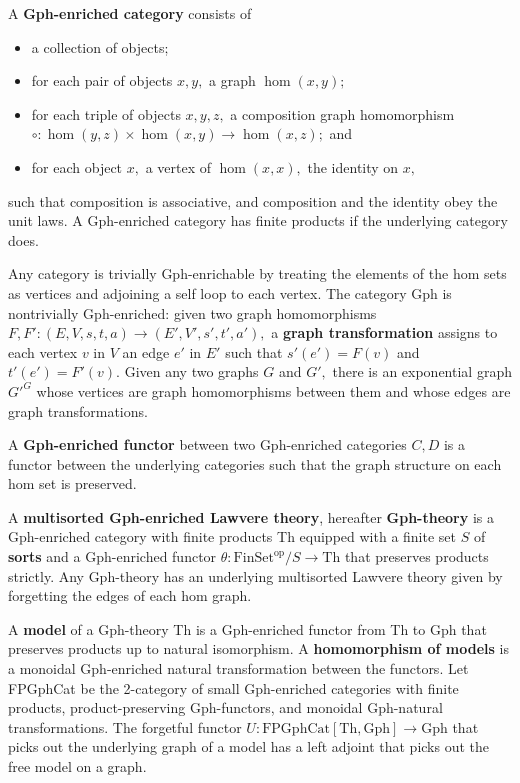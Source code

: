 \documentclass[a4paper,UKenglish]{article}
\newcommand{\maps}{\colon}
\newcommand{\Th}{\mathrm{Th}}
\newcommand{\Gph}{\mathrm{Gph}}
\newcommand{\FinSet}{\mathrm{FinSet}}
\newcommand{\FPGphCat}{\mathrm{FPGphCat}}
\newcommand{\op}{\mathrm{op}}
\begin{document}
A {\bf Gph-enriched category} consists of
\begin{itemize}
  \item a collection of objects;
  \item for each pair of objects $x, y,$ a graph $\hom(x,y);$
  \item for each triple of objects $x, y, z,$ a composition graph homomorphism $\circ\maps \hom(y, z) \times \hom(x, y) \to \hom(x, z);$ and
  \item for each object $x,$ a vertex of $\hom(x, x),$ the identity on $x,$
\end{itemize}
such that composition is associative, and composition and the identity obey the unit laws.  A Gph-enriched category has finite products if the underlying category does.

Any category is trivially Gph-enrichable by treating the elements of the hom sets as vertices and adjoining a self loop to each vertex.  The category Gph is nontrivially Gph-enriched: given two graph homomorphisms $F, F'\maps (E, V, s, t, a) \to (E', V', s', t', a'),$ a {\bf graph transformation} assigns to each vertex $v$ in $V$ an edge $e'$ in $E'$ such that $s'(e') = F(v)$ and $t'(e') = F'(v).$  Given any two graphs $G$ and $G',$ there is an exponential graph $G'^G$ whose vertices are graph homomorphisms between them and whose edges are graph transformations.

A {\bf Gph-enriched functor} between two Gph-enriched categories $C, D$ is a functor between the underlying categories such that the graph structure on each hom set is preserved.

A {\bf multisorted Gph-enriched Lawvere theory}, hereafter {\bf Gph-theory} is a Gph-enriched category with finite products Th equipped with a finite set $S$ of {\bf sorts} and a Gph-enriched functor $\theta\maps \FinSet^{\op}/S \to \Th$ that preserves products strictly.  Any Gph-theory has an underlying multisorted Lawvere theory given by forgetting the edges of each hom graph.

A {\bf model} of a Gph-theory Th is a Gph-enriched functor from Th to Gph that preserves products up to natural isomorphism.  A {\bf homomorphism of models} is a monoidal Gph-enriched natural transformation between the functors.  Let FPGphCat be the 2-category of small Gph-enriched categories with finite products, product-preserving Gph-functors, and monoidal Gph-natural transformations.  The forgetful functor $U\maps \FPGphCat[\Th, \Gph] \to \Gph$ that picks out the underlying graph of a model has a left adjoint that picks out the free model on a graph.
\end{document}

